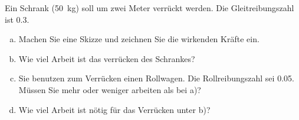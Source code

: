 
\begin{aufgabe}
	Ein Schrank (\SI{50}{kg}) soll um zwei Meter verrückt werden. Die Gleitreibungszahl ist \num{0.3}.
	\begin{enumerate} [a)]
		\item Machen Sie eine Skizze und zeichnen Sie die wirkenden Kräfte ein.
		\item	Wie viel Arbeit ist das verrücken des Schrankes?	
		\item   Sie benutzen zum Verrücken einen Rollwagen. Die Rollreibungszahl sei \num{0.05}.
			Müssen Sie mehr oder weniger arbeiten als bei a)? 
		\item Wie viel Arbeit ist nötig für das Verrücken unter b)?
	\end{enumerate}

\end{aufgabe}

